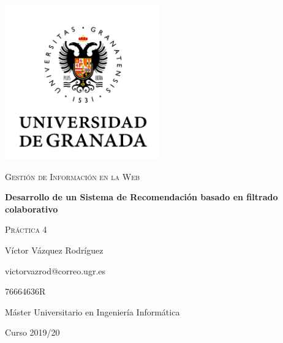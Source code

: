 \documentclass{article}
\begin{document}
\begin{titlepage}
  \centering
  \includegraphics[width=0.5\textwidth]{images/logo-ugr.png}\par
  \vspace{1cm}
  {\Large\scshape Gestión de Información en la Web \par}
  {\huge\bfseries Desarrollo de un Sistema de Recomendación basado en filtrado
  colaborativo \par}
  \vspace{0.2cm}
  {\scshape Práctica 4 \par}
  \vfill
  {\large Víctor Vázquez Rodríguez  \par}
  {victorvazrod@correo.ugr.es \par}
  {76664636R \par}
  \vfill
  {\large Máster Universitario en Ingeniería Informática \par}
  \vspace{0.2cm}
  {Curso 2019/20 \par}
\end{titlepage}

\tableofcontents\newpage

\newpage
\newpage
\newpage
\newpage
\end{document}

